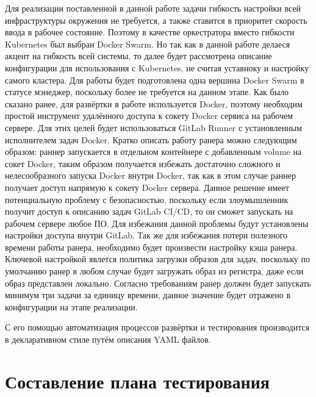 Для реализации поставленной в данной работе задачи гибкость настройки всей инфраструктуры окружения не требуется, а также ставится в приоритет скорость ввода в рабочее состояние.
Поэтому в качестве оркестратора вместо гибкости Kubernetes был выбран Docker Swarm.
Но так как в данной работе делаеся акцент на гибкость всей системы, то далее будет рассмотрена описание конфигурации для использования с Kubernetes, не считая уставноку и настройку самого кластера.
Для работы будет подготовлена одна вершина Docker Swarm в статусе мэнеджер, поскольку более не требуется на данном этапе.
\cite{web:npm:docs}
Как было сказано ранее, для развёртки в работе используется Docker, поэтому необходим простой инструмент удалённого доступа к сокету Docker сервиса на рабочем сервере.
Для этих целей будет использоваться GitLab Runner с установленным исполнителем задач Docker.
Кратко описать работу ранера можно следующим образом: раннер запускается в отдельном контейнере с добавленным volume на сокет Docker,
таким образом получается избежать достаточно сложного и нелесообразного запуска Docker внутри Docker,
так как в этом случае раннер получает доступ напрямую к сокету Docker сервера.
Данное решение имеет потенциальную проблему с безопасностью, поскольку если злоумышленник получит доступ к описанию задач GitLab CI/CD, то он сможет запускать на рабочем сервере любое ПО.
Для избежания данной проблемы будут установлены настройки доступа внутри GitLab.
Так же для избежания потери полезного времени работы ранера, необходимо будет произвести настройку кэша ранера.
Ключевой настройкой явлется политика загрузки образов для задач, поскольку по умолчанию ранер в любом случае будет загружать образ из регистра, даже если образ представлен локально.
Согласно требованиям ранер должен будет запускать минимум три задачи за единицу времени, данное значение будет отражено в конфигурации на этапе реализации.

С его помощью автоматизация процессов развёртки и тестирования производится в декларативном стиле путём описания YAML файлов.

\section{Составление плана тестирования}

